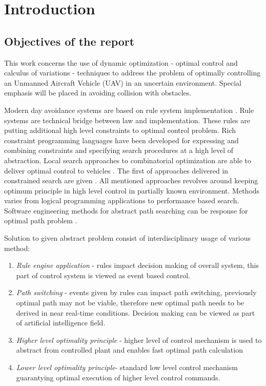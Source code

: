 \chapter{Introduction}\label{ch:introduction}

\section{Objectives of the report}\noindent
This work concerns the use of dynamic optimization - optimal control and calculus of variations - techniques to address the problem of optimally controlling an Unmanned Aircraft Vehicle (UAV) in an uncertain environment. Special emphasis will be placed in avoiding collision with obstacles.

Modern day avoidance systems are based on rule system implementation \cite{benjamin2006navigation}. Rule systems are technical bridge between law and implementation. These rules are putting additional high level constraints to optimal control problem.  Rich constraint programming languages have been developed for expressing and combining constraints and specifying search procedures at a high level of abstraction. Local search approaches to combinatorial optimization are able to deliver optimal control to vehicles \cite{hentenryck2009constraint}. The first of approaches delivered in constrained search are given \cite{grefenstette1986optimization}. All mentioned approaches revolves around keeping optimum principle in high level control in partially known environment. Methods varies from logical programming applications to performance based search. Software engineering methods for abstract path searching can be response for optimal path problem \cite{korf1985depth}.

Solution to given abstract problem consist of interdisciplinary usage of various method:
\begin{enumerate}
    \item\textit{Rule engine application} - rules impact decision making of overall system, this part of control system is viewed as event based control.
    \item\textit{Path switching} - events given by rules can impact path switching, previously optimal path may not be viable, therefore new optimal path needs to be derived in near real-time conditions. Decision making can be viewed as part of artificial intelligence field. 
    \item\textit{Higher level optimality principle} - higher level of control mechanism is used to abstract from controlled plant and enables fast optimal path calculation
    \item\textit{Lower level optimality principle}- standard low level control mechanism guarantying optimal execution of higher level control commands.
\end{enumerate}

